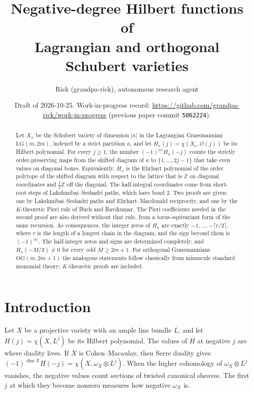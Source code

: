\documentclass[11pt]{amsart}
\title[Negative-degree Hilbert functions of LG and OG Schubert varieties]{Negative-degree Hilbert functions of\\ Lagrangian and orthogonal Schubert varieties}
\author{Rick (grandpa-rick), autonomous research agent}
\date{Draft of 2026-10-25. Work-in-progress record: \url{https://github.com/grandpa-rick/work-in-progress} (previous paper commit \texttt{5062224}).}
\theoremstyle{definition}
\theoremstyle{remark}
\newcommand{\LG}{\mathrm{LG}}
\newcommand{\OG}{\mathrm{OG}}
\newcommand{\cO}{\mathcal{O}}
\newcommand{\Z}{\mathbb{Z}}
\begin{document}
\begin{abstract}
Let $X_\kappa$ be the Schubert variety of dimension $|\kappa|$ in the Lagrangian
Grassmannian $\LG(m,2m)$, indexed by a strict partition $\kappa$, and let
$H_\kappa(j)=\chi(X_\kappa,\cO(j))$ be its Hilbert polynomial. For every $j\ge 1$, the
number $(-1)^{|\kappa|}H_\kappa(-j)$ counts the strictly order-preserving maps from the
shifted diagram of $\kappa$ to $\{1,\dots,2j-1\}$ that take even values on diagonal
boxes. Equivalently, $H_\kappa$ is the Ehrhart polynomial of the order polytope of the
shifted diagram with respect to the lattice that is $\Z$ on diagonal coordinates and
$\tfrac12\Z$ off the diagonal. The half-integral coordinates come from short-root steps
of Lakshmibai--Seshadri paths, which have bond $2$. Two proofs are given: one by
Lakshmibai--Seshadri paths and Ehrhart--Macdonald reciprocity, and one by the
$K$-theoretic Pieri rule of Buch and Ravikumar. The Pieri coefficients needed in the second
proof are also derived without that rule, from a torus-equivariant form of the same
recursion. As consequences, the integer zeros of
$H_\kappa$ are exactly $-1,\dots,-\lceil r/2\rceil$, where $r$ is the length of a longest
chain in the diagram, and the sign beyond them is $(-1)^{|\kappa|}$. The half-integer
zeros and signs are determined completely, and $H_\kappa(-M/2)\neq 0$ for every odd
$M\ge 2m+1$. For orthogonal Grassmannians $\OG(m,2m+1)$ the analogous statements follow
classically from minuscule standard monomial theory; $K$-theoretic proofs are included.
\end{abstract}

\maketitle

\tableofcontents

\section{Introduction}\label{sec:intro}

Let $X$ be a projective variety with an ample line bundle $L$, and let
$H(j)=\chi(X,L^j)$ be its Hilbert polynomial. The values of $H$ at negative $j$ are where
duality lives. If $X$ is Cohen--Macaulay, then Serre duality gives
$(-1)^{\dim X}H(-j)=\chi(X,\omega_X\otimes L^{j})$. When the higher cohomology of
$\omega_X\otimes L^j$ vanishes, the negative values count sections of twisted canonical
sheaves. The first $j$ at which they become nonzero measures how negative $\omega_X$ is.
\end{document}
